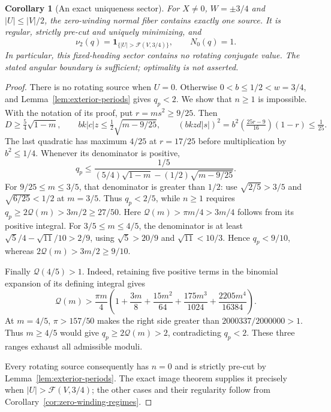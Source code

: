 \documentclass[11pt,a4paper]{article}
\newtheorem{corollary}[theorem]{Corollary}
\theoremstyle{remark}\newtheorem{remark}[theorem]{Remark}
\newcommand{\ind}{\mathbf{1}}
\begin{document}
\begin{corollary}[An exact uniqueness sector]\label{cor:exterior-sector-count}
For $X\ne0$, $W=\pm3/4$ and $|U|\le|V|/2$, the zero-winding
normal fiber contains exactly one source. It is regular, strictly pre-cut
and uniquely minimizing, and
\[
 \nu_2(q)=\ind_{\{|U|>\mathcal F(V,3/4)\}},\qquad N_0(q)=1.
\]
In particular, this fixed-heading sector contains no rotating conjugate
value. The stated angular boundary is sufficient; optimality is not asserted.
\end{corollary}
\begin{proof}
There is no rotating source when $U=0$. Otherwise $0<b\le1/2<w=3/4$,
and Lemma~\ref{lem:exterior-periods} gives $q_p<2$.
We show that $n\ge1$ is impossible. With the notation of its proof,
put $r=ms^2\ge9/25$. Then
\[
 D\ge\tfrac54\sqrt{1-m},\qquad
 bk|c|z\le\tfrac12\sqrt{m-9/25},\qquad
 (bkzd|s|)^2=b^2\left(\tfrac{25r-9}{16}\right)(1-r)\le\tfrac1{25}.
\]
The last quadratic has maximum $4/25$ at $r=17/25$ before
multiplication by $b^2\le1/4$. Whenever its denominator is positive,
\begin{equation}\label{eq:sector-drift-upper}
 q_p\le
 \frac{1/5}{(5/4)\sqrt{1-m}-(1/2)\sqrt{m-9/25}}.
\end{equation}
For $9/25\le m\le3/5$, that denominator is greater than $1/2$:
use $\sqrt{2/5}>3/5$ and $\sqrt{6/25}<1/2$ at $m=3/5$.
Thus $q_p<2/5$, while $n\ge1$ requires
$q_p\ge2\mathcal Q(m)>3m/2\ge27/50$.
Here $\mathcal Q(m)>\pi m/4>3m/4$ follows from its positive integral.
For $3/5\le m\le4/5$, the denominator is at least
$\sqrt5/4-\sqrt{11}/10>2/9$, using
$\sqrt5>20/9$ and $\sqrt{11}<10/3$.
Hence $q_p<9/10$, whereas $2\mathcal Q(m)>3m/2\ge9/10$.

Finally $\mathcal Q(4/5)>1$. Indeed, retaining five positive terms
in the binomial expansion of its defining integral gives
\[
 \mathcal Q(m)>\frac{\pi m}{4}
 \left(1+\frac{3m}{8}+\frac{15m^2}{64}
             +\frac{175m^3}{1024}+\frac{2205m^4}{16384}\right).
\]
At $m=4/5$, $\pi>157/50$ makes the right side greater than
$2000337/2000000>1$. Thus $m\ge4/5$ would give
$q_p\ge2\mathcal Q(m)>2$, contradicting $q_p<2$.
These three ranges exhaust all admissible moduli.

Every rotating source consequently has $n=0$ and is strictly pre-cut by
Lemma~\ref{lem:exterior-periods}. The exact image theorem supplies it
precisely when $|U|>\mathcal F(V,3/4)$; the other cases and their
regularity follow from Corollary~\ref{cor:zero-winding-regimes}.
\end{proof}
\end{document}
